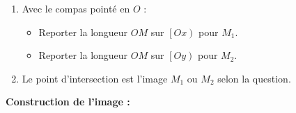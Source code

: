 \begin{methode*1}
\begin{minipage}{0.55\linewidth}
\begin{enumerate}
\begin{itemize}
            \end{itemize}
            \item Avec le compas pointé en $O$ :
            \begin{itemize}
                \item Reporter la longueur $OM$ sur $\left[Ox\right)$ pour $M_1$.
                \item Reporter la longueur $OM$ sur $\left[Oy\right)$ pour $M_2$.
            \end{itemize}
            \item Le point d'intersection est l'image $M_1$ ou $M_2$ selon la question.
        \end{enumerate}
    \end{minipage}

    \begin{myBox}{}
        \begin{minipage}{\linewidth}
            \textbf{Construction de l'image :}


            \medskip
            \creditInstrumentPoche
        \end{minipage}
    \end{myBox}
\end{methode*1}
